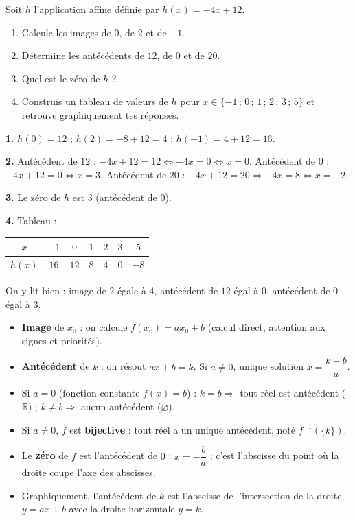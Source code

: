 \documentclass[11pt]{article}
\begin{document}
\begin{exercice}
Soit $h$ l'application affine définie par $h(x) = -4x + 12$.
\begin{enumerate}
\item Calcule les images de $0$, de $2$ et de $-1$.
\item Détermine les antécédents de $12$, de $0$ et de $20$.
\item Quel est le zéro de $h$ ?
\item Construis un tableau de valeurs de $h$ pour $x \in \{-1\,;\,0\,;\,1\,;\,2\,;\,3\,;\,5\}$ et retrouve graphiquement tes réponses.
\end{enumerate}
\end{exercice}

\begin{corrige}
\textbf{1.} $h(0) = 12$ ; $h(2) = -8 + 12 = 4$ ; $h(-1) = 4 + 12 = 16$.

\textbf{2.} Antécédent de $12$ : $-4x + 12 = 12 \iff -4x = 0 \iff x = 0$. Antécédent de $0$ : $-4x + 12 = 0 \iff x = 3$. Antécédent de $20$ : $-4x + 12 = 20 \iff -4x = 8 \iff x = -2$.

\textbf{3.} Le zéro de $h$ est $3$ (antécédent de $0$).

\textbf{4.} Tableau :
\begin{center}
\begin{tabular}{|c|c|c|c|c|c|c|}
\hline
\rowcolor{popblueL} $x$ & $-1$ & $0$ & $1$ & $2$ & $3$ & $5$ \\
\hline
$h(x)$ & $16$ & $12$ & $8$ & $4$ & $0$ & $-8$ \\
\hline
\end{tabular}
\end{center}
On y lit bien : image de $2$ égale à $4$, antécédent de $12$ égal à $0$, antécédent de $0$ égal à $3$.
\end{corrige}

\begin{aretenir}
\begin{itemize}
\item \textbf{Image} de $x_0$ : on calcule $f(x_0) = ax_0 + b$ (calcul direct, attention aux signes et priorités).
\item \textbf{Antécédent} de $k$ : on résout $ax + b = k$. Si $a \neq 0$, unique solution $x = \dfrac{k-b}{a}$.
\item Si $a = 0$ (fonction constante $f(x) = b$) : $k = b \Rightarrow$ tout réel est antécédent ($\mathbb{R}$) ; $k \neq b \Rightarrow$ aucun antécédent ($\varnothing$).
\item Si $a \neq 0$, $f$ est \textbf{bijective} : tout réel a un unique antécédent, noté $f^{-1}(\{k\})$.
\item Le \textbf{zéro} de $f$ est l'antécédent de $0$ : $x = -\dfrac{b}{a}$ ; c'est l'abscisse du point où la droite coupe l'axe des abscisses.
\item Graphiquement, l'antécédent de $k$ est l'abscisse de l'intersection de la droite $y = ax + b$ avec la droite horizontale $y = k$.
\end{itemize}
\end{aretenir}
\end{document}
